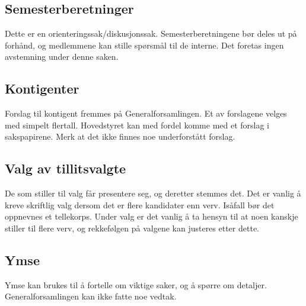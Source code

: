 \subsection{Semesterberetninger}
Dette er en orienteringssak/diskusjonssak. Semesterberetningene bør deles ut på forhånd, og medlemmene
kan stille spørsmål til de interne. Det foretas ingen avstemning under denne saken.

\subsection{Kontigenter}
Forslag til kontigent fremmes på Generalforsamlingen. Et av forslagene velges med simpelt flertall.
Hovedstyret kan med fordel komme med et forslag i sakspapirene. Merk at det ikke finnes noe underforstått
forslag.

\subsection{Valg av tillitsvalgte}
De som stiller til valg får presentere seg, og deretter stemmes det. Det er vanlig å kreve skriftlig valg
dersom det er flere kandidater enn verv. Isåfall bør det oppnevnes et tellekorps. Under valg er det vanlig
å ta hensyn til at noen kanskje stiller til flere verv, og rekkefølgen på valgene kan justeres etter dette.

\subsection{Ymse}
Ymse kan brukes til å fortelle om viktige saker, og å spørre om detaljer. Generalforsamlingen kan ikke
fatte noe vedtak.

